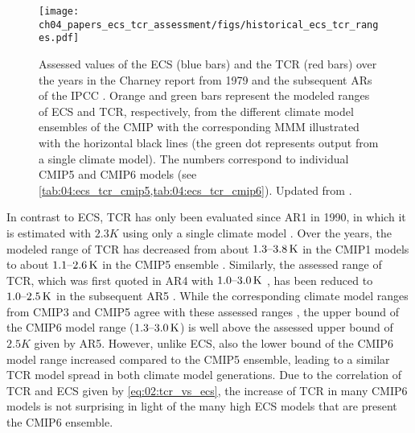 \begin{figure}[t]
  \centering
  \texttt{[image: 
    ch04\_papers\_ecs\_tcr\_assessment/figs/historical\_ecs\_tcr\_ranges.pdf]}
  \caption{Assessed values of the \acf{ECS} (blue bars) and the \acf{TCR} (red
    bars) over the years in the Charney report from 1979 \autocite{Charney1979}
    and the subsequent \acfp{AR} of the \acf{IPCC} \autocite{Mitchell1990,
      Kattenberg1996, Albritton2001, Solomon2007, Stocker2013}. Orange and
    green bars represent the modeled ranges of \acs{ECS} and \acs{TCR},
    respectively, from the different climate model ensembles of the \acf{CMIP}
    with the corresponding \acf{MMM} illustrated with the horizontal black
    lines (the green dot represents output from a single climate model). The
    numbers correspond to individual \acs{CMIP}5 and \acs{CMIP}6 models (see
    \cref{tab:04:ecs_tcr_cmip5,tab:04:ecs_tcr_cmip6}). Updated from
    \textcite{Meehl2020}.}
  \label{fig:04:historical_ecs_tcr_ranges}
\end{figure}

In contrast to \ac{ECS}, \ac{TCR} has only been evaluated since \acs{AR}1 in
1990, in which it is estimated with $2.3 \unit{K}$ using only a single climate
model . Over the years, the modeled range
of \ac{TCR} has decreased from about $\range{1.3}{3.8} \unit{K}$ in the
\acs{CMIP}1 models \autocite{Kattenberg1996} to about $\range{1.1}{2.6}
\unit{K}$ in the \acs{CMIP}5 ensemble \autocite{Flato2013}. Similarly, the
assessed range of \ac{TCR}, which was first quoted in \acs{AR}4 with
$\range{1.0}{3.0} \unit{K}$ \autocite{Solomon2007}, has been reduced to
$\range{1.0}{2.5} \unit{K}$ in the subsequent \acs{AR}5 \autocite{Stocker2013}.
While the corresponding climate model ranges from \acs{CMIP}3 and \acs{CMIP}5
agree with these assessed ranges \autocite{Randall2007, Flato2013}, the upper
bound of the \acs{CMIP}6 model range ($\range{1.3}{3.0} \unit{K}$) is well
above the assessed upper bound of $2.5 \unit{K}$ given by \acs{AR}5. However,
unlike \ac{ECS}, also the lower bound of the \acs{CMIP}6 model range increased
compared to the \acs{CMIP}5 ensemble, leading to a similar \ac{TCR} model
spread in both climate model generations. Due to the correlation of \ac{TCR}
and \ac{ECS} given by \cref{eq:02:tcr_vs_ecs}, the increase of \ac{TCR} in many
\acs{CMIP}6 models is not surprising in light of the many high \ac{ECS} models
that are present the \acs{CMIP}6 ensemble.


